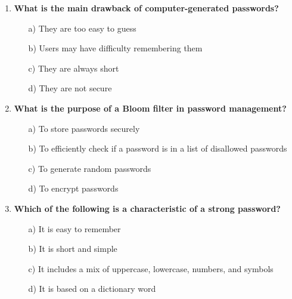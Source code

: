 \documentclass{article}
\begin{document}
\begin{enumerate}
    \item \textbf{What is the main drawback of computer-generated passwords?}
    \begin{itemize}
        \item[a)] They are too easy to guess  
        \item[b)] Users may have difficulty remembering them  
        \item[c)] They are always short  
        \item[d)] They are not secure  
    \end{itemize}
\newpage
    \item \textbf{What is the purpose of a Bloom filter in password management?}
    \begin{itemize}
        \item[a)] To store passwords securely  
        \item[b)] To efficiently check if a password is in a list of disallowed passwords  
        \item[c)] To generate random passwords  
        \item[d)] To encrypt passwords  
    \end{itemize}

    \item \textbf{Which of the following is a characteristic of a strong password?}
    \begin{itemize}
        \item[a)] It is easy to remember  
        \item[b)] It is short and simple  
        \item[c)] It includes a mix of uppercase, lowercase, numbers, and symbols  
        \item[d)] It is based on a dictionary word  
    \end{itemize}
\end{enumerate}
\end{document}
